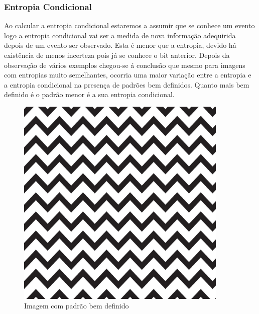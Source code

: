 \documentclass[12pt]{article}
\begin{document}
\subsubsection{Entropia Condicional}
Ao calcular a entropia condicional estaremos a assumir que se conhece um evento logo a entropia condicional vai ser a medida de nova informação adequirida depois de um evento ser observado. Esta é menor que a entropia, devido há existência de menos incerteza pois já se conhece o bit anterior. Depois da observação de vários exemplos chegou-se á conclusão que mesmo para imagens com entropias muito semelhantes, ocorria uma maior variação entre a entropia e a entropia condicional na presença de padrões bem definidos. Quanto mais bem definido é o padrão menor é a sua entropia condicional.

\begin{figure}[htb!]
    \centering
    \begin{minipage}{0.45\textwidth}
        \centering
        \includegraphics[width=0.9\textwidth]{padrao2.jpg}
        \caption{Imagem com padrão bem definido}
    \end{minipage}\hfill
    \begin{minipage}{0.45\textwidth}
        \centering

\end{minipage}
\end{figure}
\end{document}
